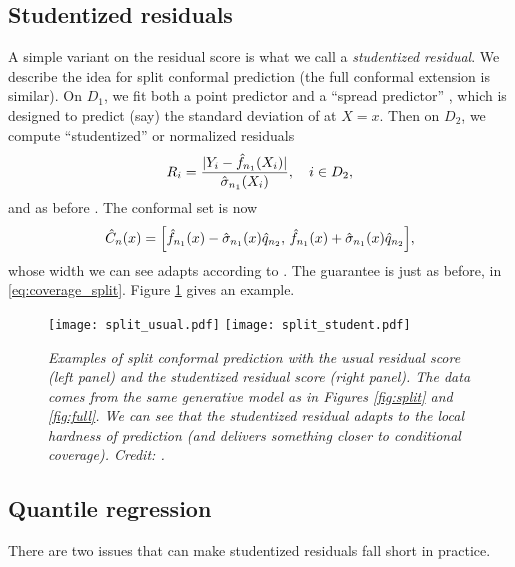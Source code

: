 \documentclass{article}
\begin{document}
\subsection{Studentized residuals}

A simple variant on the residual score is what we call a \emph{studentized
  residual}. We describe the idea for split conformal prediction (the full
conformal extension is similar). On $D_1$, we fit both a point predictor
 and a ``spread predictor'' , which 
is designed to predict (say) the standard deviation of  at $X = x$. Then on $D_2$, we compute ``studentized'' or 
normalized residuals 
\[
R_i = \frac{|Y_i - \hat{f}_{n_1}(X_i)|}{\hat\sigma_{n_1}(X_i)}, \quad i \in D_2, 
\]
and as before . The conformal set is now   
\begin{equation}
\label{eq:cset_std_split}
\hat{C}_n(x) = \Big[ \hat{f}_{n_1}(x) - \hat\sigma_{n_1}(x) \hat{q}_{n_2}, \, 
\hat{f}_{n_1}(x) + \hat\sigma_{n_1}(x) \hat{q}_{n_2} \Big],   
\end{equation}
whose width we can see adapts according to . The
guarantee is just as before, in \eqref{eq:coverage_split}. Figure
\ref{fig:student} gives an example.  

\begin{figure}[htb]
\centering
\texttt{[image: split\_usual.pdf]}
\texttt{[image: split\_student.pdf]}
\caption{\it Examples of split conformal prediction with the usual residual
  score (left panel) and the studentized residual score (right panel). The data
  comes from the same generative model as in Figures \ref{fig:split} and 
  \ref{fig:full}. We can see that the studentized residual adapts to the local
  hardness of prediction (and delivers something closer to conditional
  coverage). Credit: \citet{lei2018distribution}.} 
\label{fig:student}
\end{figure}

\subsection{Quantile regression}

There are two issues that can make studentized residuals fall short in practice.   
\end{document}
